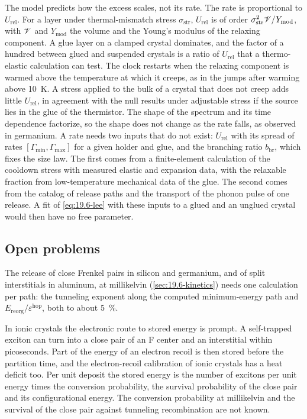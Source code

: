 The model predicts how the excess scales, not its rate. The rate is proportional to $U_{\mathrm{rel}}$. For a layer under thermal-mismatch stress $\sigma_{\mathrm{str}}$, $U_{\mathrm{rel}}$ is of order $\sigma_{\mathrm{str}}^2\mathscr{V}/Y_{\mathrm{mod}}$, with $\mathscr{V}$ and $Y_{\mathrm{mod}}$ the volume and the Young's modulus of the relaxing component. A glue layer on a clamped crystal dominates, and the factor of a hundred between glued and suspended crystals is a ratio of $U_{\mathrm{rel}}$ that a thermo-elastic calculation can test. The clock restarts when the relaxing component is warmed above the temperature at which it creeps, as in the jumps after warming above \SI{10}{K}. A stress applied to the bulk of a crystal that does not creep adds little $U_{\mathrm{rel}}$, in agreement with the null results under adjustable stress if the source lies in the glue of the thermistor. The shape of the spectrum and its time dependence factorize, so the shape does not change as the rate falls, as observed in germanium. A rate needs two inputs that do not exist: $U_{\mathrm{rel}}$ with its spread of rates $[\varGamma_{\min}, \varGamma_{\max}]$ for a given holder and glue, and the branching ratio $b_{\mathrm{br}}$, which fixes the size law. The first comes from a finite-element calculation of the cooldown stress with measured elastic and expansion data, with the relaxable fraction from low-temperature mechanical data of the glue. The second comes from the catalog of release paths and the transport of the phonon pulse of one release. A fit of \cref{eq:19.6-lee} with these inputs to a glued and an unglued crystal would then have no free parameter.

\subsection{Open problems}\label{sec:19.6-open}

The release of close Frenkel pairs in silicon and germanium, and of split interstitials in aluminum, at millikelvin (\cref{sec:19.6-kinetics}) needs one calculation per path: the tunneling exponent along the computed minimum-energy path and $E_{\mathrm{reorg}}/\varepsilon^{\mathrm{hop}}$, both to about \SI{5}{\percent}.

In ionic crystals the electronic route to stored energy is prompt. A self-trapped exciton can turn into a close pair of an F center and an interstitial within picoseconds. Part of the energy of an electron recoil is then stored before the partition time, and the electron-recoil calibration of ionic crystals has a heat deficit too. Per unit deposit the stored energy is the number of excitons per unit energy times the conversion probability, the survival probability of the close pair and its configurational energy. The conversion probability at millikelvin and the survival of the close pair against tunneling recombination are not known.

